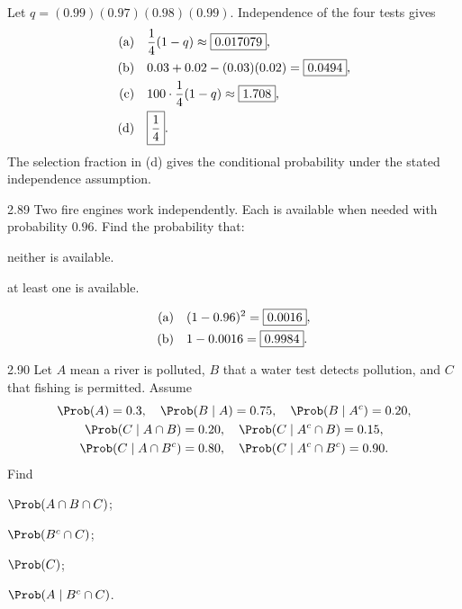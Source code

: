 \documentclass[11pt,oneside]{article}
\begin{document}
\begin{solution}
Let $q=(0.99)(0.97)(0.98)(0.99)$. Independence of the four tests gives
\begin{align*}
\textup{(a)}\quad&\frac14(1-q)\approx\boxed{0.017079},\\
\textup{(b)}\quad&0.03+0.02-(0.03)(0.02)=\boxed{0.0494},\\
\textup{(c)}\quad&100\cdot\frac14(1-q)\approx\boxed{1.708},\\
\textup{(d)}\quad&\boxed{\frac14}.
\end{align*}
The selection fraction in (d) gives the conditional probability under the stated independence assumption.
\end{solution}

\begin{exercise}{2.89}
Two fire engines work independently. Each is available when needed with probability $0.96$. Find the probability that:
\begin{exercisesubparts}
\item neither is available.
\item at least one is available.
\end{exercisesubparts}
\end{exercise}

\begin{solution}
\begin{align*}
\textup{(a)}\quad&(1-0.96)^2=\boxed{0.0016},\\
\textup{(b)}\quad&1-0.0016=\boxed{0.9984}.
\end{align*}
\end{solution}

\begin{exercise}{2.90}
Let $A$ mean a river is polluted, $B$ that a water test detects pollution, and $C$ that fishing is permitted. Assume
\[
\begin{gathered}
\Prob(A)=0.3,\quad \Prob(B\mid A)=0.75,\quad \Prob(B\mid A^c)=0.20,\\
\Prob(C\mid A\cap B)=0.20,\quad \Prob(C\mid A^c\cap B)=0.15,\\
\Prob(C\mid A\cap B^c)=0.80,\quad\Prob(C\mid A^c\cap B^c)=0.90.
\end{gathered}
\]
Find
\par
\begin{exercisesubparts}
\item $\Prob(A\cap B\cap C)$;
\item $\Prob(B^c\cap C)$;
\item $\Prob(C)$;
\item $\Prob(A\mid B^c\cap C)$.
\end{exercisesubparts}
\end{exercise}
\end{document}

